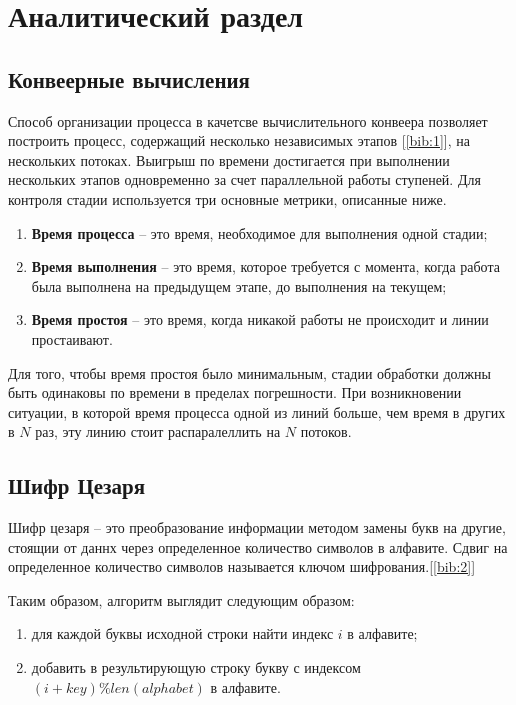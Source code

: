 \chapter{Аналитический раздел}
\label{cha:analytical}
    \section{Конвеерные вычисления}
    \par Способ организации процесса в качетсве вычислительного конвеера позволяет построить процесс, содержащий несколько независимых этапов [\ref{bib:1}], на нескольких потоках. Выигрыш по времени достигается при выполнении нескольких этапов одновременно за счет параллельной работы ступеней. Для контроля стадии используется три основные метрики, описанные ниже.
    \begin{enumerate}
    	\item \textbf{Время процесса} -- это время, необходимое для выполнения одной стадии;
    	\item \textbf{Время выполнения} -- это время, которое требуется с момента, когда работа была выполнена на предыдущем этапе, до выполнения на текущем;
    	\item \textbf{Время простоя} -- это время, когда никакой работы не происходит и линии простаивают.
    \end{enumerate}

    Для того, чтобы время простоя было минимальным, стадии обработки должны быть одинаковы по времени в пределах погрешности. При возникновении ситуации, в которой время процесса одной из линий больше, чем время в других в $N$ раз, эту линию стоит распаралеллить на $N$ потоков.

\section{Шифр Цезаря}
	\par Шифр цезаря -- это преобразование информации методом замены букв на другие, стоящии от даннх через определенное количество символов в алфавите. Сдвиг на определенное количество символов называется ключом шифрования.[\ref{bib:2}]
	\par Таким образом, алгоритм выглядит следующим образом:
	\begin{enumerate}
		\item для каждой буквы исходной строки найти индекс $i$ в алфавите;
		\item добавить в результирующую строку букву с индексом \begin{math} (i+key)\%len(alphabet)\end{math} в алфавите.
	\end{enumerate}

